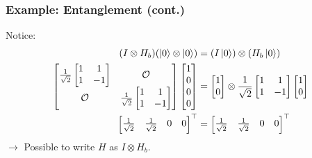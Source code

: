 \documentclass{beamer}
\theoremstyle{definition}
\begin{document}
\begin{frame}
\frametitle{Example: Entanglement (cont.)}
Notice:
\begin{align*}
(I \otimes H_b)(\left\vert{0}\right\rangle \otimes \left\vert{0}\right\rangle) &= (I\left\vert{0}\right\rangle) \otimes (H_b\left\vert{0}\right\rangle)\\
\begin{bmatrix}
\frac{1}{\sqrt{2}}\begin{bmatrix}
1&1\\
1&-1
\end{bmatrix}& \mathcal{O}\\
\mathcal{O} & \frac{1}{\sqrt{2}}\begin{bmatrix}
1&1\\1&-1
\end{bmatrix}
\end{bmatrix}\begin{bmatrix}
1\\0\\0\\0
\end{bmatrix}
&=
\begin{bmatrix}
1\\0
\end{bmatrix}
\otimes
\frac{1}{\sqrt{2}}
\begin{bmatrix}
1&1\\1&-1
\end{bmatrix}
\begin{bmatrix}
1\\0
\end{bmatrix}\\
\begin{bmatrix}
\frac{1}{\sqrt{2}} & \frac{1}{\sqrt{2}} & 0&0
\end{bmatrix}^\top &= \begin{bmatrix}\frac{1}{\sqrt{2}} & \frac{1}{\sqrt{2}} & 0&0
\end{bmatrix}^\top 
\end{align*}
$\rightarrow$ Possible to write $H$ as $I \otimes H_b$.
\end{frame}
\end{document}
